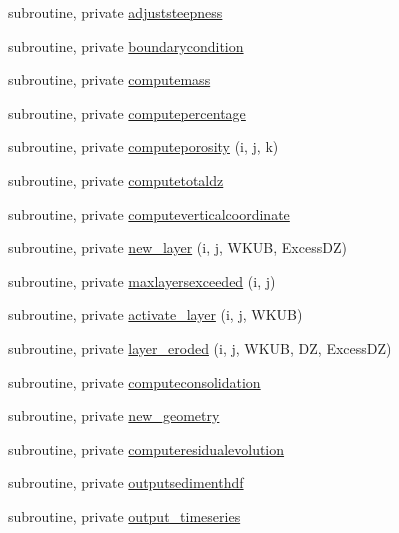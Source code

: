 \begin{DoxyCompactItemize}
\item 
subroutine, private \mbox{\hyperlink{namespacemodulesediment_aa82529eb8b689ee3ddf738441376e275}{adjuststeepness}}
\item 
subroutine, private \mbox{\hyperlink{namespacemodulesediment_a3b2c4d5436d7504be300368e5a584c64}{boundarycondition}}
\item 
subroutine, private \mbox{\hyperlink{namespacemodulesediment_a38f45fc06e83e0a40fda99cfc71c39ce}{computemass}}
\item 
subroutine, private \mbox{\hyperlink{namespacemodulesediment_a967461a16889fe7be50495dad90a178a}{computepercentage}}
\item 
subroutine, private \mbox{\hyperlink{namespacemodulesediment_a12a98e7d5cf87fedaf983b4eb24c1633}{computeporosity}} (i, j, k)
\item 
subroutine, private \mbox{\hyperlink{namespacemodulesediment_a9aa4c5d236de77268f5aa5b54dfdab36}{computetotaldz}}
\item 
subroutine, private \mbox{\hyperlink{namespacemodulesediment_ae2d0c9fdf078f2fd81047486eb734a9d}{computeverticalcoordinate}}
\item 
subroutine, private \mbox{\hyperlink{namespacemodulesediment_acfebb5e32f4481cbb0199b98dc4ff545}{new\+\_\+layer}} (i, j, W\+K\+UB, Excess\+DZ)
\item 
subroutine, private \mbox{\hyperlink{namespacemodulesediment_aac53266b3dac9076f1df37c49e676383}{maxlayersexceeded}} (i, j)
\item 
subroutine, private \mbox{\hyperlink{namespacemodulesediment_a2047f2985bf32ff5a12cbd0def21cf95}{activate\+\_\+layer}} (i, j, W\+K\+UB)
\item 
subroutine, private \mbox{\hyperlink{namespacemodulesediment_aba4245ac07452ebcf189f0cf9617d234}{layer\+\_\+eroded}} (i, j, W\+K\+UB, DZ, Excess\+DZ)
\item 
subroutine, private \mbox{\hyperlink{namespacemodulesediment_a513f33f980769b37c74ea34212fad388}{computeconsolidation}}
\item 
subroutine, private \mbox{\hyperlink{namespacemodulesediment_aa3fda34444f716aac00714d297af27d3}{new\+\_\+geometry}}
\item 
subroutine, private \mbox{\hyperlink{namespacemodulesediment_ad51d2a28e0487a18346c78ef17c13307}{computeresidualevolution}}
\item 
subroutine, private \mbox{\hyperlink{namespacemodulesediment_abfa4d5937f78f3781b6b3108b8068185}{outputsedimenthdf}}
\item 
subroutine, private \mbox{\hyperlink{namespacemodulesediment_a5763876f73ef752f30208f2fd9aba61e}{output\+\_\+timeseries}}

\end{DoxyCompactItemize}
